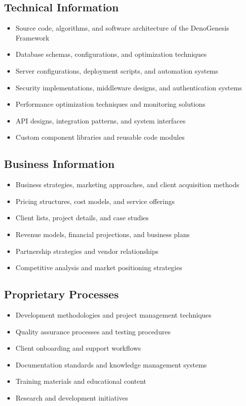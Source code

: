 \documentclass[11pt,letterpaper]{article}
\begin{document}
\subsection{Technical Information}
\begin{itemize}[leftmargin=0.5cm]
    \item Source code, algorithms, and software architecture of the DenoGenesis Framework
    \item Database schemas, configurations, and optimization techniques
    \item Server configurations, deployment scripts, and automation systems
    \item Security implementations, middleware designs, and authentication systems
    \item Performance optimization techniques and monitoring solutions
    \item API designs, integration patterns, and system interfaces
    \item Custom component libraries and reusable code modules
\end{itemize}

\subsection{Business Information}
\begin{itemize}[leftmargin=0.5cm]
    \item Business strategies, marketing approaches, and client acquisition methods
    \item Pricing structures, cost models, and service offerings
    \item Client lists, project details, and case studies
    \item Revenue models, financial projections, and business plans
    \item Partnership strategies and vendor relationships
    \item Competitive analysis and market positioning strategies
\end{itemize}

\subsection{Proprietary Processes}
\begin{itemize}[leftmargin=0.5cm]
    \item Development methodologies and project management techniques
    \item Quality assurance processes and testing procedures
    \item Client onboarding and support workflows
    \item Documentation standards and knowledge management systems
    \item Training materials and educational content
    \item Research and development initiatives
\end{itemize}
\end{document}
